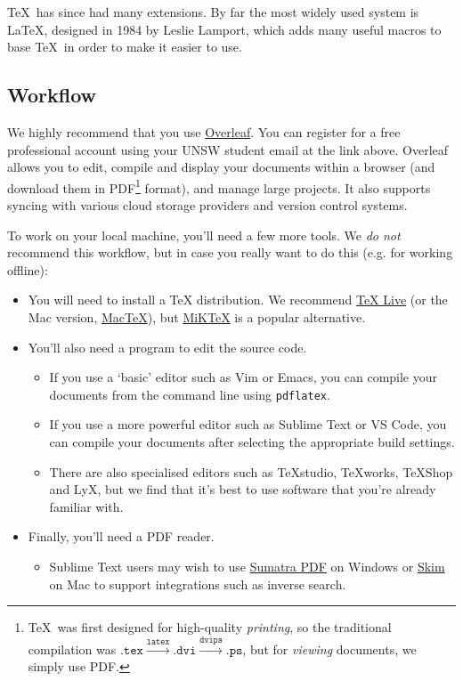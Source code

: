 \documentclass[12pt]{article}
\begin{document}
\TeX\ has since had many extensions. By far the most widely used system is \LaTeX, designed in 1984 by Leslie Lamport, which adds many useful macros to base \TeX\ in order to make it easier to use.

\subsection*{Workflow}

We highly recommend that you use \href{https://www.overleaf.com/sso-login}{Overleaf}. You can register for a free professional account using your UNSW student email at the link above. Overleaf allows you to edit, compile and display your documents within a browser (and download them in PDF\footnote{\TeX\ was first designed for high-quality \emph{printing}, so the traditional compilation was $\texttt{.tex} \xrightarrow{\texttt{latex}} \texttt{.dvi} \xrightarrow{\texttt{dvips}} \texttt{.ps}$, but for \emph{viewing} documents, we simply use PDF.} format), and manage large projects. It also supports syncing with various cloud storage providers and version control systems.

To work on your local machine, you'll need a few more tools. We \emph{do not} recommend this workflow, but in case you really want to do this (e.g. for working offline):
\begin{itemize}
    \item You will need to install a TeX distribution. We recommend \href{https://tug.org/texlive/}{TeX Live} (or the Mac version, \href{https://tug.org/mactex}{MacTeX}), but \href{https://miktex.org}{MiKTeX} is a popular alternative.
    \item You'll also need a program to edit the source code.
    \begin{itemize}
        \item If you use a `basic' editor such as Vim or Emacs, you can compile your documents from the command line using \texttt{pdflatex}.
        \item If you use a more powerful editor such as Sublime Text or VS Code, you can compile your documents after selecting the appropriate build settings.
        \item There are also specialised editors such as TeXstudio, TeXworks, TeXShop and LyX, but we find that it's best to use software that you're already familiar with.
    \end{itemize}
    \item Finally, you'll need a PDF reader.
    \begin{itemize}
        \item Sublime Text users may wish to use \href{https://www.sumatrapdfreader.org/free-pdf-reader}{Sumatra PDF} on Windows or \href{https://skim-app.sourceforge.io/}{Skim} on Mac to support integrations such as inverse search.
    \end{itemize}
\end{itemize}
\end{document}
